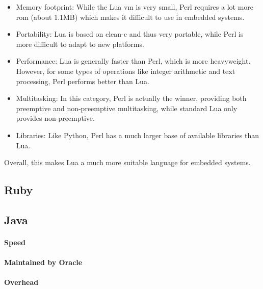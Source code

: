\begin{itemize}
	\item{Memory footprint:} While the Lua \gls{vm} is very small, Perl requires a lot more \gls{rom} (about 1.1MB) which makes it difficult to use in embedded systems.
	\item{Portability:} Lua is based on \gls{clean-c} and thus very portable, while Perl is more difficult to adapt to new platforms.
	\item{Performance:} Lua is generally faster than Perl, which is more heavyweight. However, for some types of operations like integer arithmetic and text processing, Perl performs better than Lua.
	\item{Multitasking:} In this category, Perl is actually the winner, providing both preemptive and non-preemptive multitasking, while standard Lua only provides non-preemptive.
	\item{Libraries:} Like Python, Perl has a much larger base of available libraries than Lua.
\end{itemize}

Overall, this makes Lua a much more suitable language for embedded systems.

\subsection{Ruby}
\label{sec:lua_vs_ruby}


\subsection{Java}
\label{sec:lua_comp_java}


\paragraph{Speed}

\paragraph{Maintained by Oracle}

\paragraph{Overhead}


